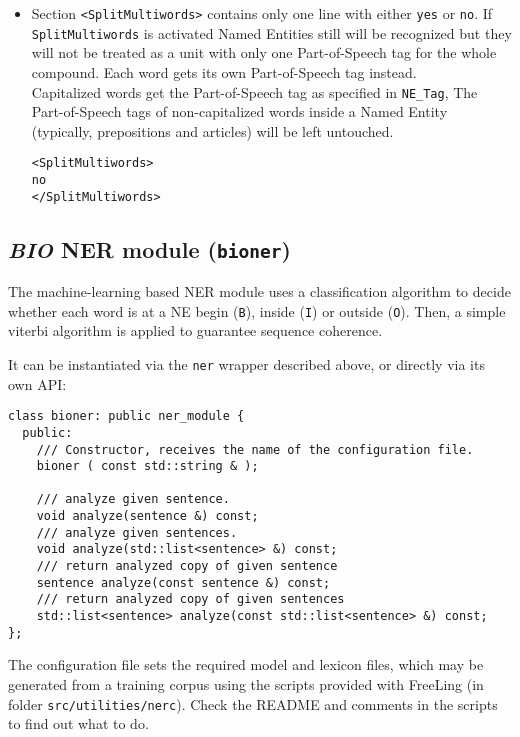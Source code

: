 \documentclass[a4paper]{book}
\begin{document}
\begin{itemize}
    \item Section \verb#<SplitMultiwords># contains only one line with
      either \verb#yes# or \verb#no#. If \verb#SplitMultiwords# is
      activated Named Entities still will be recognized but they will
      not be treated as a unit with only one Part-of-Speech tag for
      the whole compound. Each word gets its own Part-of-Speech tag
      instead.\\ Capitalized words get the Part-of-Speech tag as
      specified in \verb#NE_Tag#, The Part-of-Speech tags of
      non-capitalized words inside a Named Entity (typically,
      prepositions and articles) will be left untouched.
\begin{verbatim}
<SplitMultiwords>
no
</SplitMultiwords>
\end{verbatim}
\end{itemize}


\subsection{{\em BIO} NER module ({\tt bioner})}

  The machine-learning based NER module uses a classification algorithm 
 to decide whether each word is at a NE begin ({\tt B}), inside ({\tt I})
 or outside ({\tt O}). Then, a simple viterbi algorithm is applied to
 guarantee sequence coherence.

 It can be instantiated via the {\tt ner} wrapper described above, or
 directly via its own API:
\begin{verbatim}
class bioner: public ner_module {
  public:
    /// Constructor, receives the name of the configuration file.
    bioner ( const std::string & );

    /// analyze given sentence.
    void analyze(sentence &) const;
    /// analyze given sentences.
    void analyze(std::list<sentence> &) const;
    /// return analyzed copy of given sentence
    sentence analyze(const sentence &) const;
    /// return analyzed copy of given sentences
    std::list<sentence> analyze(const std::list<sentence> &) const;
};
\end{verbatim}

  The configuration file sets the required model and lexicon files, which
  may be generated from a training corpus using the scripts provided 
  with FreeLing (in folder {\tt src/utilities/nerc}).
  Check the README and comments in the scripts to find out what to do.
\end{document}
